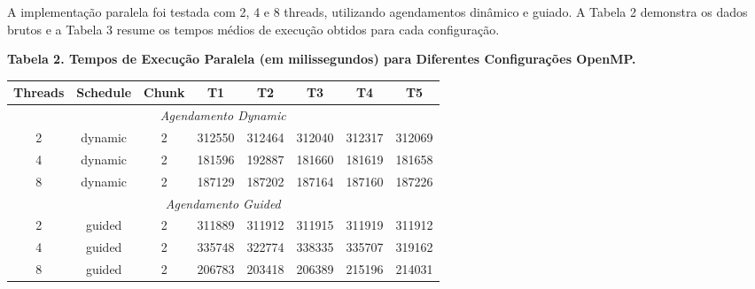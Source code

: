 \documentclass[12pt]{article}
\begin{document}
A implementação paralela foi testada com 2, 4 e 8 threads, utilizando agendamentos dinâmico e guiado. A Tabela 2 demonstra os dados brutos e a Tabela 3 resume os tempos médios de execução obtidos para cada configuração.
\medskip	
\begin{center}
    \textbf{Tabela 2. Tempos de Execução Paralela (em milissegundos) para Diferentes Configurações OpenMP.} \\ 
    \begin{tabular}{cccccccc}
        \toprule
        \textbf{Threads} & \textbf{Schedule} & \textbf{Chunk} & \textbf{T1} & \textbf{T2} & \textbf{T3} & \textbf{T4} & \textbf{T5} \\
        \midrule
        \multicolumn{8}{c}{\textit{Agendamento Dynamic}} \\
        \midrule
        2 & dynamic & 2 & 312550 & 312464 & 312040 & 312317 & 312069 \\
        \rowcolor[gray]{0.9}
        4 & dynamic & 2 & 181596 & 192887 & 181660 & 181619 & 181658 \\
        8 & dynamic & 2 & 187129 & 187202 & 187164 & 187160 & 187226 \\
        \midrule
        \multicolumn{8}{c}{\textit{Agendamento Guided}} \\
        \midrule
        2 & guided & 2 & 311889 & 311912 & 311915 & 311919 & 311912 \\
        4 & guided & 2 & 335748 & 322774 & 338335 & 335707 & 319162 \\
        8 & guided & 2 & 206783 & 203418 & 206389 & 215196 & 214031 \\
        \bottomrule
    \end{tabular}
\end{center}

\bigskip
\end{document}
